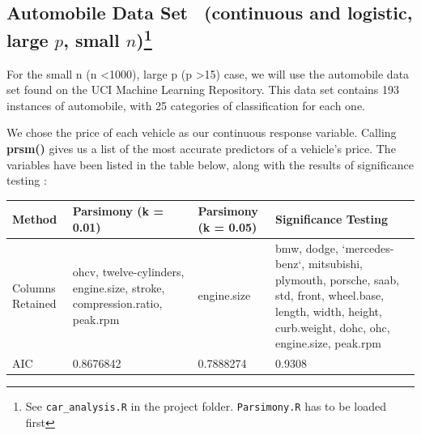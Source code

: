 \documentclass[letter]{article}
\newcounter{foot}
\begin{document}
\newpage

\subsection*{Automobile Data Set~\cite{automobile} (continuous and logistic, large $p$, small $n$)\footnote{See \texttt{car\_analysis.R} in the project folder. \texttt{Parsimony.R} has to be loaded first}}

For the small n (n \textless 1000), large p (p \textgreater 15) case, we will use the automobile data set found on the UCI Machine Learning Repository.  This data set contains 193 instances of automobile, with 25 categories of classification for each one.

We chose the price of each vehicle as our continuous response variable.  Calling \textbf{prsm()} gives us a list of the most accurate predictors of a vehicle's price.  The variables have been listed in the table below, along with the results of significance testing : \\
\begin{center}
    \begin{tabular}{ | l |  p{4cm} |  p{4cm} | p{4cm} |}
    \hline
    Method & Parsimony (k = 0.01) & Parsimony (k = 0.05) & Significance Testing \\ \hline
    
    Columns Retained & ohcv, twelve-cylinders, engine.size, stroke, compression.ratio, peak.rpm & engine.size & bmw, dodge, `mercedes-benz`, mitsubishi, plymouth, porsche, saab, std, front, wheel.base, length, width, height, curb.weight, dohc, ohc, engine.size, peak.rpm\\ \hline
    
    AIC & 0.8676842 & 0.7888274 & 0.9308\\ \hline
    
    \end{tabular}
\end{center}
\end{document}
